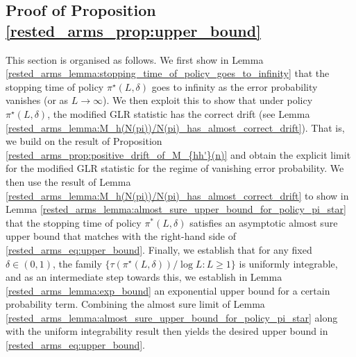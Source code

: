 \subsection{Proof of Proposition \ref{rested_arms_prop:upper_bound}}\label{rested_arms_appndx:proof_of_upper_bound}
This section is organised as follows. We first show in Lemma \ref{rested_arms_lemma:stopping_time_of_policy_goes_to_infinity} that the stopping time of policy $\pi^\star(L,\delta)$ goes to infinity as the error probability vanishes (or as $L\to\infty$). We then exploit this to show that under policy $\pi^\star(L,\delta)$, the modified GLR statistic has the correct drift (see Lemma \ref{rested_arms_lemma:M_h(N(pi))/N(pi)_has_almost_correct_drift}). That is, we build on the result of Proposition \ref{rested_arms_prop:positive_drift_of_M_{hh'}(n)} and obtain the explicit limit for the modified GLR statistic for the regime of vanishing error probability. We then use the result of Lemma \ref{rested_arms_lemma:M_h(N(pi))/N(pi)_has_almost_correct_drift} to show in Lemma \ref{rested_arms_lemma:almost_sure_upper_bound_for_policy_pi_star} that the stopping time of policy $\pi^*(L,\delta)$ satisfies an asymptotic almost sure upper bound that matches with the right-hand side of \eqref{rested_arms_eq:upper_bound}. Finally, we establish that for any fixed $\delta\in(0,1)$, the family $\{\tau(\pi^\star(L,\delta))/\log L:L\geq 1\}$ is uniformly integrable, and as an intermediate step towards this, we establish in Lemma \ref{rested_arms_lemma:exp_bound}  an exponential upper bound for a certain probability term. Combining the almost sure limit of Lemma \ref{rested_arms_lemma:almost_sure_upper_bound_for_policy_pi_star} along with the uniform integrability result then yields the desired upper bound in \eqref{rested_arms_eq:upper_bound}.


